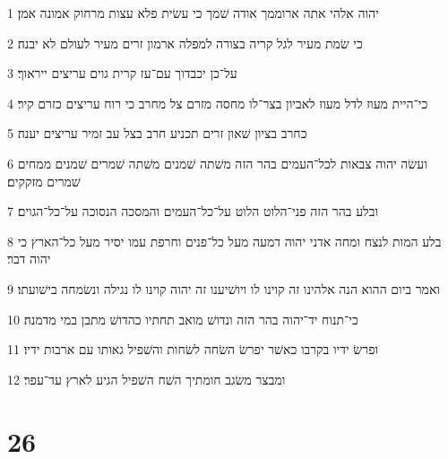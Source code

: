 \par 1 יהוה אלהי אתה ארוממך אודה שׁמך כי עשׂית פלא עצות מרחוק אמונה אמן׃
\par 2 כי שׂמת מעיר לגל קריה בצורה למפלה ארמון זרים מעיר לעולם לא יבנה׃
\par 3 על־כן יכבדוך עם־עז קרית גוים עריצים ייראוך׃
\par 4 כי־היית מעוז לדל מעוז לאביון בצר־לו מחסה מזרם צל מחרב כי רוח עריצים כזרם קיר׃
\par 5 כחרב בציון שׁאון זרים תכניע חרב בצל עב זמיר עריצים יענה׃
\par 6 ועשׂה יהוה צבאות לכל־העמים בהר הזה משׁתה שׁמנים משׁתה שׁמרים שׁמנים ממחים שׁמרים מזקקים׃
\par 7 ובלע בהר הזה פני־הלוט הלוט על־כל־העמים והמסכה הנסוכה על־כל־הגוים׃
\par 8 בלע המות לנצח ומחה אדני יהוה דמעה מעל כל־פנים וחרפת עמו יסיר מעל כל־הארץ כי יהוה דבר׃
\par 9 ואמר ביום ההוא הנה אלהינו זה קוינו לו ויושׁיענו זה יהוה קוינו לו נגילה ונשׂמחה בישׁועתו׃
\par 10 כי־תנוח יד־יהוה בהר הזה ונדושׁ מואב תחתיו כהדושׁ מתבן במי מדמנה׃
\par 11 ופרשׂ ידיו בקרבו כאשׁר יפרשׂ השׂחה לשׂחות והשׁפיל גאותו עם ארבות ידיו׃
\par 12 ומבצר משׂגב חומתיך השׁח השׁפיל הגיע לארץ עד־עפר׃

\chapter{26}

